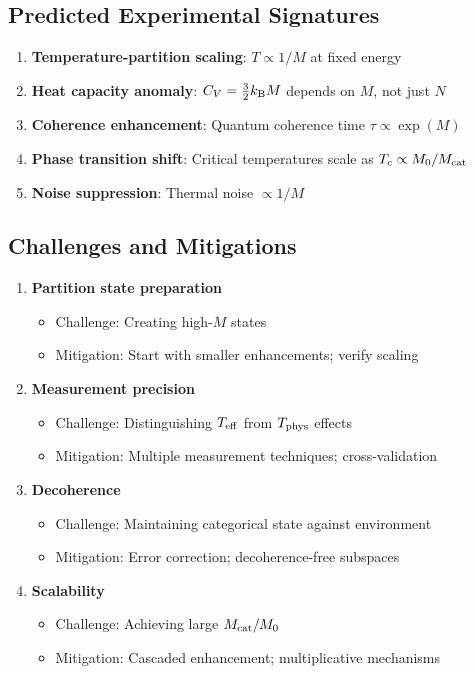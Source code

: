 \subsection{Predicted Experimental Signatures}

\begin{enumerate}
    \item \textbf{Temperature-partition scaling}: $T \propto 1/M$ at fixed energy

    \item \textbf{Heat capacity anomaly}: $C_V = \frac{3}{2}k_{\mathrm{B}} M$ depends on $M$, not just $N$

    \item \textbf{Coherence enhancement}: Quantum coherence time $\tau \propto \exp(M)$

    \item \textbf{Phase transition shift}: Critical temperatures scale as $T_c \propto M_0/M_{\mathrm{cat}}$

    \item \textbf{Noise suppression}: Thermal noise $\propto 1/M$
\end{enumerate}

\subsection{Challenges and Mitigations}

\begin{enumerate}
    \item \textbf{Partition state preparation}
    \begin{itemize}
        \item Challenge: Creating high-$M$ states
        \item Mitigation: Start with smaller enhancements; verify scaling
    \end{itemize}

    \item \textbf{Measurement precision}
    \begin{itemize}
        \item Challenge: Distinguishing $T_{\mathrm{eff}}$ from $T_{\mathrm{phys}}$ effects
        \item Mitigation: Multiple measurement techniques; cross-validation
    \end{itemize}

    \item \textbf{Decoherence}
    \begin{itemize}
        \item Challenge: Maintaining categorical state against environment
        \item Mitigation: Error correction; decoherence-free subspaces
    \end{itemize}

    \item \textbf{Scalability}
    \begin{itemize}
        \item Challenge: Achieving large $M_{\mathrm{cat}}/M_0$
        \item Mitigation: Cascaded enhancement; multiplicative mechanisms
    \end{itemize}
\end{enumerate}

